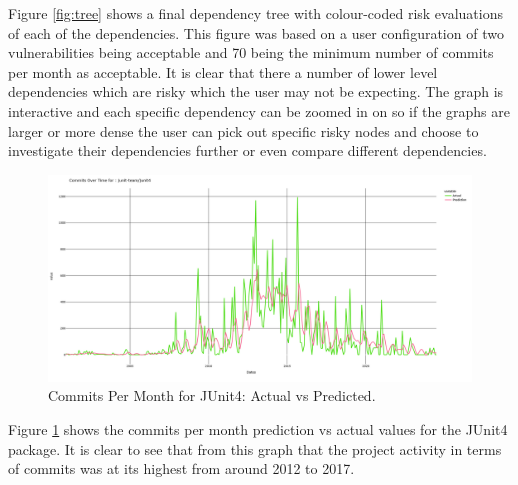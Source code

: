 \documentclass[conference]{IEEEtran}
\begin{document}
Figure \ref{fig:tree} shows a final dependency tree with colour-coded risk evaluations of each of the dependencies. This figure was based on a user configuration of two vulnerabilities being acceptable and 70 being the minimum number of commits per month as acceptable. It is clear that there a number of lower level dependencies which are risky which the user may not be expecting. The graph is interactive and each specific dependency can be zoomed in on so if the graphs are larger or more dense the user can pick out specific risky nodes and choose to investigate their dependencies further or even compare different dependencies. 

\begin{figure}[H]
    \centering
    \includegraphics[width=1\linewidth]{JUnit4commits.png}
    \caption{Commits Per Month for JUnit4: Actual vs Predicted.} 
    \label{fig:commits}
\end{figure}

Figure \ref{fig:commits} shows the commits per month prediction vs actual values for the JUnit4 package. It is clear to see that from this graph that the project activity in terms of commits was at its highest from around 2012 to 2017. 
\end{document}
